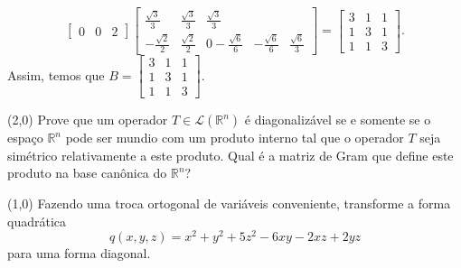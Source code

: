 \documentclass[11pt,a4paper]{article}
\begin{document}
{\[\begin{bmatrix}
0 & 0 & 2
\end{bmatrix}\begin{bmatrix}
 \frac{\sqrt{3}}{3} &  \frac{\sqrt{3}}{3}  &  \frac{\sqrt{3}}{3} \\
- \frac{\sqrt{2}}{2} &\frac{\sqrt{2}}{2} & 0 
- \frac{\sqrt{6}}{6} & - \frac{\sqrt{6}}{6}&  \frac{\sqrt{6}}{3}  
\end{bmatrix} = \begin{bmatrix}
3 & 1 & 1 \\
1 & 3 & 1 \\
1 & 1 & 3
\end{bmatrix}.
\]
Assim, temos que $B = \begin{bmatrix}
3 & 1 & 1 \\
1 & 3 & 1 \\
1 & 1 & 3
\end{bmatrix}.$
}
\begin{exercicio}
(2,0) Prove que um operador $T \in \mathcal{L}(\mathbb{R}^n)$ é diagonalizável se e somente se o espaço $\mathbb{R}^n$ pode ser mundio com um produto interno tal que o operador $T$ seja simétrico relativamente a este produto. Qual é a matriz de Gram que define este produto na base canônica do $\mathbb{R}^n?$
\end{exercicio}
\solucao{}
\begin{exercicio}
(1,0) Fazendo uma troca ortogonal de variáveis conveniente, transforme a forma quadrática
\[
q(x,y,z) = x^2 + y^2 +5z^2 - 6xy - 2xz + 2yz
\]
para uma forma diagonal.
\end{exercicio}
\end{document}
